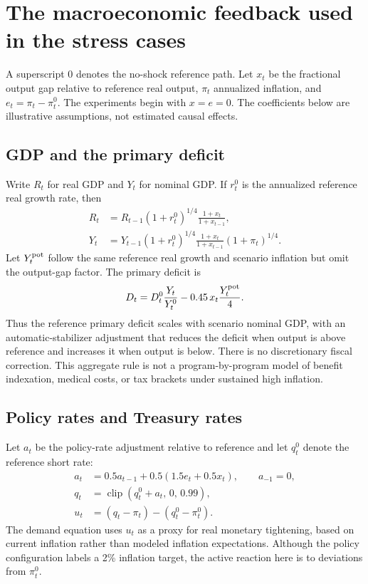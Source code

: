 \documentclass[11pt,letterpaper]{article}
\begin{document}
\section{The macroeconomic feedback used in the stress cases}

A superscript \(0\) denotes the no-shock reference path. Let \(x_t\) be the
fractional output gap relative to reference real output, \(\pi_t\) annualized
inflation, and \(e_t=\pi_t-\pi^0_t\). The experiments begin with \(x=e=0\).
The coefficients below are illustrative assumptions, not estimated causal
effects.

\subsection*{GDP and the primary deficit}

Write \(R_t\) for real GDP and \(Y_t\) for nominal GDP. If
\(r^0_t\) is the annualized reference real growth rate, then
\begin{align}
 R_t&=R_{t-1}(1+r^0_t)^{1/4}
       \frac{1+x_t}{1+x_{t-1}},\\
 Y_t&=Y_{t-1}(1+r^0_t)^{1/4}
       \frac{1+x_t}{1+x_{t-1}}(1+\pi_t)^{1/4}.
\end{align}
Let \(Y^{\rm pot}_t\) follow the same reference real growth and scenario
inflation but omit the output-gap factor. The primary deficit is
\begin{equation}
 D_t=D^0_t\frac{Y_t}{Y^0_t}-0.45\,x_t\frac{Y^{\rm pot}_t}{4}.
 \label{eq:primary}
\end{equation}
Thus the reference primary deficit scales with scenario nominal GDP, with
an automatic-stabilizer adjustment that reduces the deficit when output is
above reference and increases it when output is below. There is no
discretionary fiscal correction. This aggregate rule is not a
program-by-program model of benefit indexation, medical costs, or tax brackets
under sustained high inflation.

\subsection*{Policy rates and Treasury rates}

Let \(a_t\) be the policy-rate adjustment relative to reference and let
\(q^0_t\) denote the reference short rate:
\begin{align}
 a_t&=0.5a_{t-1}+0.5(1.5e_t+0.5x_t),\qquad a_{-1}=0,\\
 q_t&=\operatorname{clip}(q^0_t+a_t,\,0,\,0.99),\\
 u_t&=(q_t-\pi_t)-(q^0_t-\pi^0_t).
\end{align}
The demand equation uses \(u_t\) as a proxy for real monetary tightening,
based on current inflation rather than modeled inflation expectations.
Although the policy configuration labels a 2\% inflation target, the active
reaction here is to deviations from \(\pi^0_t\).
\end{document}
